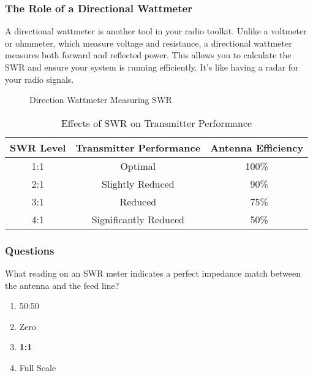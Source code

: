 \subsubsection*{The Role of a Directional Wattmeter}
A directional wattmeter is another tool in your radio toolkit. Unlike a voltmeter or ohmmeter, which measure voltage and resistance, a directional wattmeter measures both forward and reflected power. This allows you to calculate the SWR and ensure your system is running efficiently. It's like having a radar for your radio signals.


\begin{figure}[h]
    \centering
    \caption{Direction Wattmeter Measuring SWR}
    \label{fig:directional-wattmeter}
\end{figure}

\begin{table}[h]
    \centering
    \begin{tabular}{|c|c|c|}
        \hline
        \textbf{SWR Level} & \textbf{Transmitter Performance} & \textbf{Antenna Efficiency} \\
        \hline
        1:1 & Optimal & 100\% \\
        2:1 & Slightly Reduced & ~90\% \\
        3:1 & Reduced & ~75\% \\
        4:1 & Significantly Reduced & ~50\% \\
        \hline
    \end{tabular}
    \caption{Effects of SWR on Transmitter Performance}
    \label{tab:swr-effects}
\end{table}

\subsubsection*{Questions}

\begin{tcolorbox}[colback=gray!10!white,colframe=black!75!black,title={T7C04}]
    What reading on an SWR meter indicates a perfect impedance match between the antenna and the feed line?
    \begin{enumerate}[label=\Alph*),noitemsep]
        \item 50:50
        \item Zero
        \item \textbf{1:1}
        \item Full Scale
    \end{enumerate}
\end{tcolorbox}

